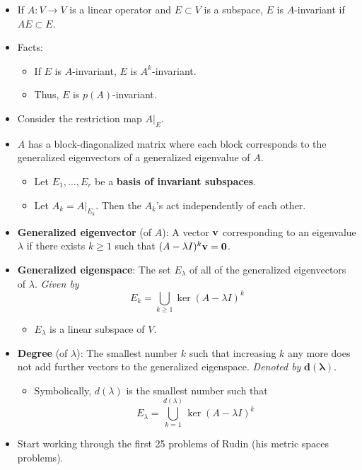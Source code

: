 \documentclass[../../notes.tex]{subfiles}
\begin{document}
\begin{itemize}
    \item If $A:V\to V$ is a linear operator and $E\subset V$ is a subspace, $E$ is $A$-invariant if $AE\subset E$.
    \item Facts:
    \begin{itemize}
        \item If $E$ is $A$-invariant, $E$ is $A^k$-invariant.
        \item Thus, $E$ is $p(A)$-invariant.
    \end{itemize}
    \item Consider the restriction map $A|_E$.
    \item $A$ has a block-diagonalized matrix where each block corresponds to the generalized eigenvectors of a generalized eigenvalue of $A$.
    \begin{itemize}
        \item Let $E_1,\dots,E_r$ be a \textbf{basis of invariant subspaces}.
        \item Let $A_k=A|_{E_k}$. Then the $A_k$'s act independently of each other.
    \end{itemize}
    \item \textbf{Generalized eigenvector} (of $A$): A vector $\mathbf{v}$ corresponding to an eigenvalue $\lambda$ if there exists $k\geq 1$ such that $(A-\lambda I)^k\mathbf{v}=\bm{0}$.
    \item \textbf{Generalized eigenspace}: The set $E_\lambda$ of all of the generalized eigenvectors of $\lambda$. \emph{Given by}
    \begin{equation*}
        E_k = \bigcup_{k\geq 1}\ker(A-\lambda I)^k
    \end{equation*}
    \begin{itemize}
        \item $E_\lambda$ is a linear subspace of $V$.
    \end{itemize}
    \item \textbf{Degree} (of $\lambda$): The smallest number $k$ such that increasing $k$ any more does not add further vectors to the generalized eigenspace. \emph{Denoted by} $\bm{d(\lambda)}$.
    \begin{itemize}
        \item Symbolically, $d(\lambda)$ is the smallest number such that
        \begin{equation*}
            E_\lambda = \bigcup_{k=1}^{d(\lambda)}\ker(A-\lambda I)^k
        \end{equation*}
    \end{itemize}
    \item Start working through the first 25 problems of Rudin (his metric spaces problems).
\end{itemize}
\end{document}
